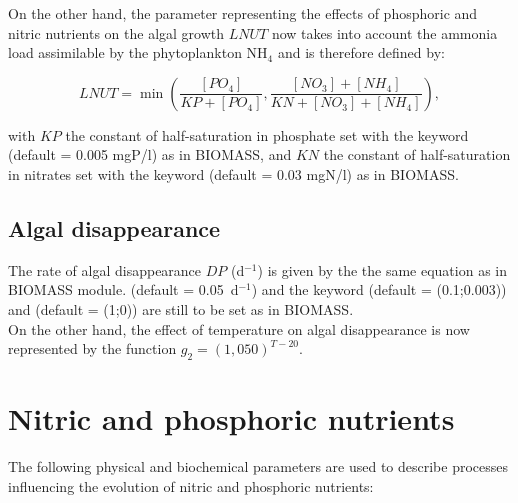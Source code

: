 On the other hand, the parameter representing the effects of phosphoric
and nitric nutrients on the algal growth $LNUT$ now takes into account
the ammonia load assimilable by the phytoplankton NH$_4$ and is therefore defined by:

\begin{equation}
  LNUT = \min \left( \frac{[PO_4]}{KP+[PO_4]}, \frac{[NO_3]+[NH_4]}{KN+[NO_3]+[NH_4]} \right),
\end{equation}

with $KP$ the constant of half-saturation in phosphate
set with the keyword 
(default = 0.005 mgP/l) as in BIOMASS,
and $KN$ the constant of half-saturation in nitrates
set with the keyword 
(default = 0.03 mgN/l) as in BIOMASS.\\

\subsection{Algal disappearance}

The rate of algal disappearance $DP$ (d$^{-1}$) is given
by the the same equation as in BIOMASS module.
(default = 0.05~d$^{-1}$) and the keyword
 (default = (0.1;0.003))
and  (default = (1;0))
are still to be set as in BIOMASS.\\

On the other hand, the effect of temperature on algal disappearance
is now represented by the function $g_2 = (1,050)^{T-20}$.

\section{Nitric and phosphoric nutrients}

The following physical and biochemical parameters are used to describe processes
influencing the evolution of nitric and phosphoric nutrients:

